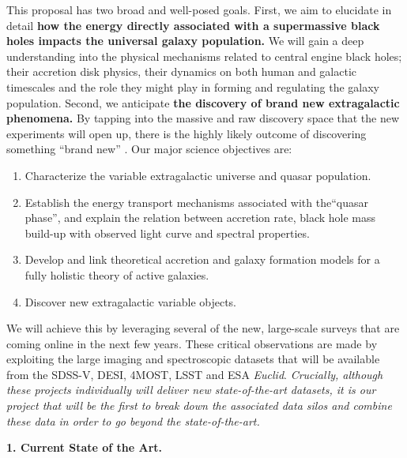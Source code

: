 \documentclass[oneside, a4paper, onecolumn, 11pt]{article}
\begin{document}
\smallskip
\smallskip
\noindent
This proposal has two broad and well-posed goals. First, we aim to
elucidate in detail {\bf how the energy directly associated with a
supermassive black holes impacts the universal galaxy population.} We
will gain a deep understanding into the physical mechanisms related to
central engine black holes; their accretion disk physics, their
dynamics on both human and galactic timescales and the role they might
play in forming and regulating the galaxy population.
Second, we anticipate {\bf the discovery of brand new extragalactic
phenomena.}  By tapping into the massive and raw discovery space that
the new experiments will open up, there is the highly likely outcome
of discovering something ``brand new'' \citep{Ivezic2008,
LSST_ScienceBook}.
Our major science objectives are:
\begin{enumerate}
\item Characterize the variable extragalactic universe and quasar population. 
\item Establish the energy transport mechanisms associated with the``quasar phase'', and explain the relation between accretion rate, black hole mass build-up with observed light curve and spectral properties. 
\item Develop and link theoretical accretion and galaxy formation models for a fully holistic theory of active galaxies. 
\item Discover new extragalactic variable objects. 
\end{enumerate}


\smallskip
\smallskip
\noindent
We will achieve this by leveraging several of the new, large-scale surveys that are coming online in the next few years. These critical observations are made by exploiting the large imaging and spectroscopic datasets that will be available from the SDSS-V, DESI, 4MOST, LSST and ESA {\it Euclid}. {\it Crucially, although these  projects individually will deliver new state-of-the-art datasets, it is our project that will be the first to break down the associated data  silos and combine these data in order to go beyond the state-of-the-art.}

\medskip
\medskip
\noindent
\large
{\bf{\textcolor{Cerulean}{1. Current State of the Art.}}}
\normalsize
\end{document}
